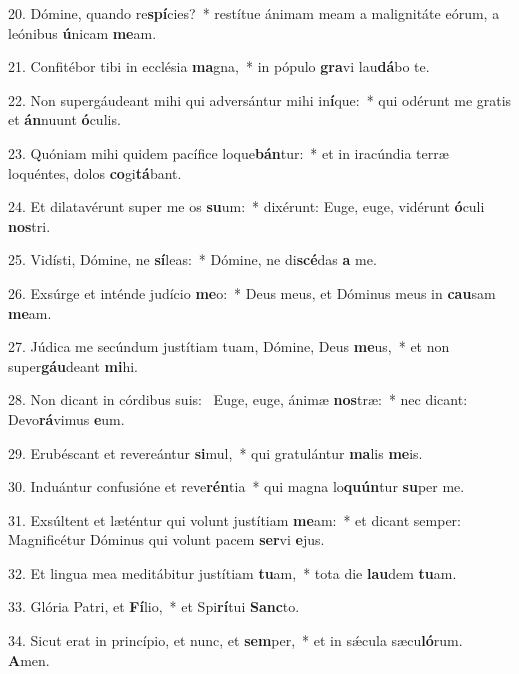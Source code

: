 20. Dómine, quando re\textbf{spí}cies?~*  restítue ánimam meam a malignitáte eórum, a leónibus \textbf{ú}nicam \textbf{me}am.\

21. Confitébor tibi in ecclésia \textbf{ma}gna,~*  in pópulo \textbf{gra}vi lau\textbf{dá}bo te.\

22. Non supergáudeant mihi qui adversántur mihi in\textbf{í}que:~*  qui odérunt me gratis et \textbf{án}nuunt \textbf{ó}culis.\

23. Quóniam mihi quidem pacífice loque\textbf{bán}tur:~*  et in iracúndia terræ loquéntes, dolos \textbf{co}gi\textbf{tá}bant.\

24. Et dilatavérunt super me os \textbf{su}um:~*  dixérunt: Euge, euge, vidérunt \textbf{ó}culi \textbf{nos}tri.\

25. Vidísti, Dómine, ne \textbf{sí}leas:~*  Dómine, ne di\textbf{scé}das \textbf{a} me.\

26. Exsúrge et inténde judício \textbf{me}o:~*  Deus meus, et Dóminus meus in \textbf{cau}sam \textbf{me}am.\

27. Júdica me secúndum justítiam tuam, Dómine, Deus \textbf{me}us,~*  et non super\textbf{gáu}deant \textbf{mi}hi.\

28. Non dicant in córdibus suis: \dag\  Euge, euge, ánimæ \textbf{nos}træ:~*  nec dicant: Devo\textbf{rá}vimus \textbf{e}um.\

29. Erubéscant et revereántur \textbf{si}mul,~*  qui gratulántur \textbf{ma}lis \textbf{me}is.\

30. Induántur confusióne et reve\textbf{rén}tia~*  qui magna lo\textbf{quún}tur \textbf{su}per me.\

31. Exsúltent et læténtur qui volunt justítiam \textbf{me}am:~*  et dicant semper: Magnificétur Dóminus qui volunt pacem \textbf{ser}vi \textbf{e}jus.\

32. Et lingua mea meditábitur justítiam \textbf{tu}am,~*  tota die \textbf{lau}dem \textbf{tu}am.\

33. Glória Patri, et \textbf{Fí}lio,~*  et Spi\textbf{rí}tui \textbf{Sanc}to.\

34. Sicut erat in princípio, et nunc, et \textbf{sem}per,~*  et in sǽcula sæcu\textbf{ló}rum. \textbf{A}men.\

